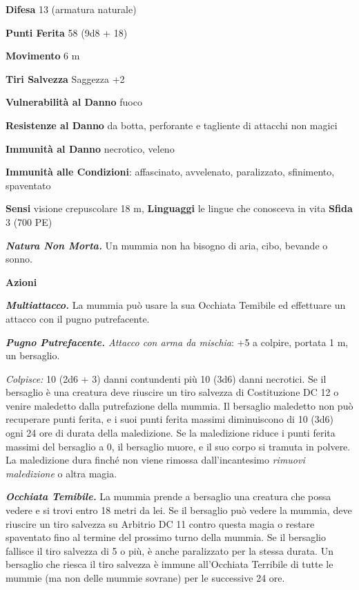 \begin{multicols}{2}
\textbf{Difesa} 13 (armatura naturale)

\textbf{Punti Ferita} 58 (9d8 + 18)

\textbf{Movimento} 6 m

\textbf{Tiri Salvezza} Saggezza +2

\textbf{Vulnerabilità al Danno} fuoco

\textbf{Resistenze al Danno} da botta, perforante e tagliente di
attacchi non magici

\textbf{Immunità al Danno} necrotico, veleno

\textbf{Immunità alle Condizioni}: affascinato, avvelenato, paralizzato,
sfinimento, spaventato

\textbf{Sensi} visione crepuscolare 18 m, 
\textbf{Linguaggi} le lingue che conosceva in vita \textbf{Sfida} 3 (700
PE)\smallskip

\emph{\textbf{Natura Non Morta.}} Un mummia non ha bisogno di aria,
cibo, bevande o sonno.

\smallskip\textbf{Azioni}

\emph{\textbf{Multiattacco.}} La mummia può usare la sua Occhiata
Temibile ed effettuare un attacco con il pugno putrefacente.

\emph{\textbf{Pugno Putrefacente.} Attacco con arma da mischia}: +5 a
colpire, portata 1 m, un bersaglio.

\emph{Colpisce:} 10 (2d6 + 3) danni contundenti più 10 (3d6) danni
necrotici. Se il bersaglio è una creatura deve riuscire un tiro salvezza
di Costituzione DC 12 o venire maledetto dalla putrefazione della
mummia. Il bersaglio maledetto non può recuperare punti ferita, e i suoi
punti ferita massimi diminuiscono di 10 (3d6) ogni 24 ore di durata
della maledizione. Se la maledizione riduce i punti ferita massimi del
bersaglio a 0, il bersaglio muore, e il suo corpo si tramuta in polvere.
La maledizione dura finché non viene rimossa dall'incantesimo
\emph{rimuovi maledizione} o altra magia.

\emph{\textbf{Occhiata Temibile.}} La mummia prende a bersaglio una
creatura che possa vedere e si trovi entro 18 metri da lei. Se il
bersaglio può vedere la mummia, deve riuscire un tiro salvezza su Arbitrio DC 11 contro questa magia o restare spaventato fino al termine
del prossimo turno della mummia. Se il bersaglio fallisce il tiro
salvezza di 5 o più, è anche paralizzato per la stessa durata. Un
bersaglio che riesca il tiro salvezza è immune all'Occhiata Terribile di
tutte le mummie (ma non delle mummie sovrane) per le successive 24 ore.


\end{multicols}
